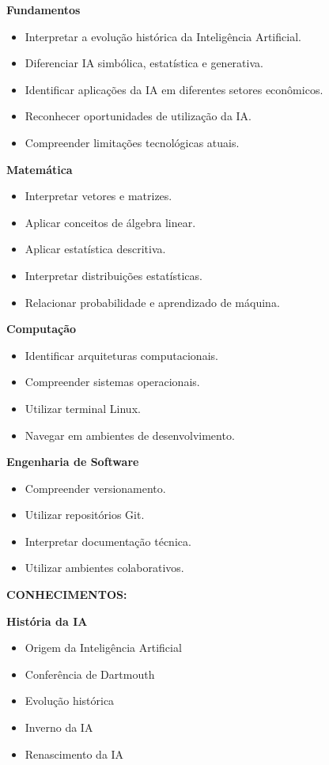 \textbf{Fundamentos}
\begin{itemize}
    \item Interpretar a evolução histórica da Inteligência Artificial.
    \item Diferenciar IA simbólica, estatística e generativa.
    \item Identificar aplicações da IA em diferentes setores econômicos.
    \item Reconhecer oportunidades de utilização da IA.
    \item Compreender limitações tecnológicas atuais.
\end{itemize}

\textbf{Matemática}
\begin{itemize}
    \item Interpretar vetores e matrizes.
    \item Aplicar conceitos de álgebra linear.
    \item Aplicar estatística descritiva.
    \item Interpretar distribuições estatísticas.
    \item Relacionar probabilidade e aprendizado de máquina.
\end{itemize}

\textbf{Computação}
\begin{itemize}
    \item Identificar arquiteturas computacionais.
    \item Compreender sistemas operacionais.
    \item Utilizar terminal Linux.
    \item Navegar em ambientes de desenvolvimento.
\end{itemize}

\textbf{Engenharia de Software}
\begin{itemize}
    \item Compreender versionamento.
    \item Utilizar repositórios Git.
    \item Interpretar documentação técnica.
    \item Utilizar ambientes colaborativos.
\end{itemize}

\textbf{CONHECIMENTOS:}

\textbf{História da IA}
\begin{itemize}
    \item Origem da Inteligência Artificial
    \item Conferência de Dartmouth
    \item Evolução histórica
    \item Inverno da IA
    \item Renascimento da IA
\end{itemize}

